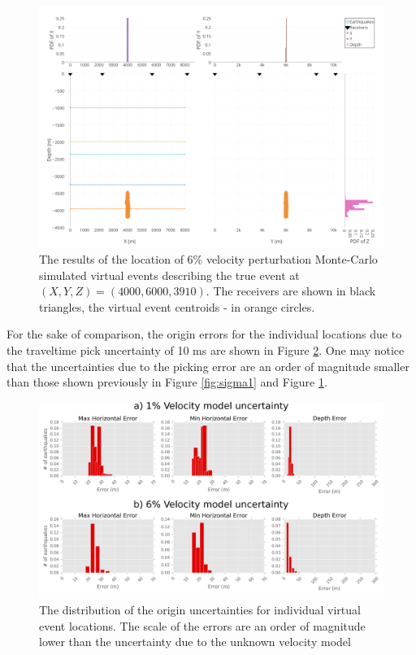 \begin{figure}[htb]
\begin{center}
\includegraphics[width=0.8\linewidth,angle=0]{./AntonBiryukov_bibtex/Figure1_6pct.png}
\end{center}
\vspace{-4mm}
\caption{The results of the location of 6\% velocity perturbation Monte-Carlo simulated virtual events describing the true event at $(X,Y,Z) = (4000,6000,3910)$. The receivers are shown in black triangles, the virtual event centroids - in orange circles.}
\label{fig:sigma6}
\end{figure}

For the sake of comparison, the origin errors for the individual locations due to the traveltime pick uncertainty of 10 ms are shown in Figure \ref{fig:ind_error}. One may notice that the uncertainties due to the picking error are an order of magnitude smaller than those shown previously in Figure \ref{fig:sigma1} and Figure \ref{fig:sigma6}.

\begin{figure}[htb]
\begin{center}
\includegraphics[width=0.85\linewidth,angle=0]{./AntonBiryukov_bibtex/figure_inderr.png}
\end{center}
\vspace{-4mm}
\caption{The distribution of the origin uncertainties for individual virtual event locations. The scale of the errors are an order of magnitude lower than the uncertainty due to the unknown velocity model}
\label{fig:ind_error}
\end{figure}

